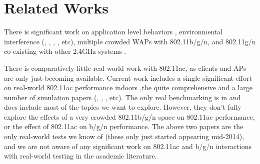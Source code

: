 \section{Related Works}
There is significant work on application level behaviors
\cite{verkaik2009softspeak}, environmental interference
(\cite{kamerman1997microwave}, \cite{golmie2003interference},
\cite{shin2007mutual}, \cite{gummadi2007understanding}, etc), multiple
crowded WAPs \cite{fuxjager2007myth} with 802.11b/g/n, and 802.11g/n
co-existing with other 2.4GHz systems \cite{petrova2007interference}.

There is comparatively little real-world work with 802.11ac, as
clients and APs are only just becoming available. Current work
includes a single significant effort on real-world 802.11ac
performance indoors \cite{dianu2014measurement},the quite
comprehensive \cite{zeng2014first} and a large number of simulation
papers (\cite{bellalta2012performance}, \cite{ong2011ieee},
\cite{redieteab2012mu} , etc). The only real benchmarking is in
\cite{zeng2014first} and does include most of the topics we want to
explore. However, they don't fully explore the effects of a very
crowded 802.11b/g/n space on 802.11ac performance, or the effect of
802.11ac on b/g/n performance. The above two papers are the only
real-world tests we know of (these only just started appearing
mid-2014), and we are not aware of any significant work on 802.11ac
and b/g/n interactions with real-world testing in the academic
literature.
